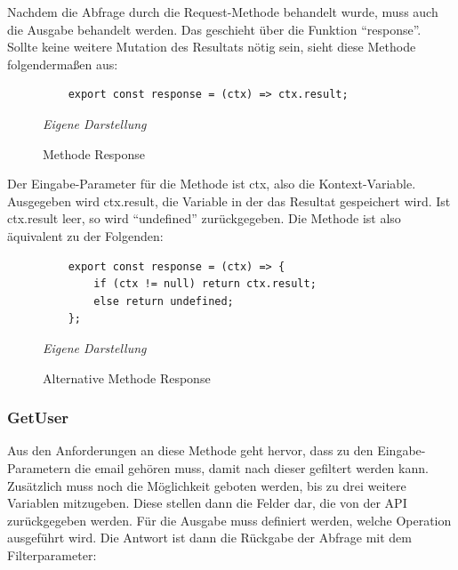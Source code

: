 Nachdem die Abfrage durch die Request-Methode behandelt wurde, muss auch die Ausgabe behandelt werden. Das geschieht über die Funktion ``response''. Sollte keine weitere Mutation des Resultats nötig sein, sieht diese Methode folgendermaßen aus:\newline
	\begin{figure}[H]
	\centering
	\begin{minipage}[t]{.7\textwidth} %
	\caption{Methode Response} %
	\begin{verbatim}
	export const response = (ctx) => ctx.result;
	\end{verbatim}

	\textit{Eigene Darstellung} %
	\label{fig:responseMethode}
	\end{minipage}
	\end{figure}
Der Eingabe-Parameter für die Methode ist ctx, also die Kontext-Variable. Ausgegeben wird ctx.result, die Variable in der das Resultat gespeichert wird. Ist ctx.result leer, so wird ``undefined'' zurückgegeben. Die Methode ist also äquivalent zu der Folgenden:\newline
	\begin{figure}[H]
	\centering
	\begin{minipage}[t]{.7\textwidth} %
	\caption{Alternative Methode Response} %
	\begin{verbatim}
	export const response = (ctx) => {
	    if (ctx != null) return ctx.result;
	    else return undefined;
	};
	\end{verbatim}

	\textit{Eigene Darstellung} %
	\label{fig:alternativeResponseMethode}
	\end{minipage}
	\end{figure}\newpage
	\subsubsection{GetUser}
	
Aus den Anforderungen an diese Methode geht hervor, dass zu den Eingabe-Parametern die email gehören muss, damit nach dieser gefiltert werden kann. Zusätzlich muss noch die Möglichkeit geboten werden, bis zu drei weitere Variablen mitzugeben. Diese stellen dann die Felder dar, die von der API zurückgegeben werden. Für die Ausgabe muss definiert werden, welche Operation ausgeführt wird. Die Antwort ist dann die Rückgabe der Abfrage mit dem Filterparameter:\newline

